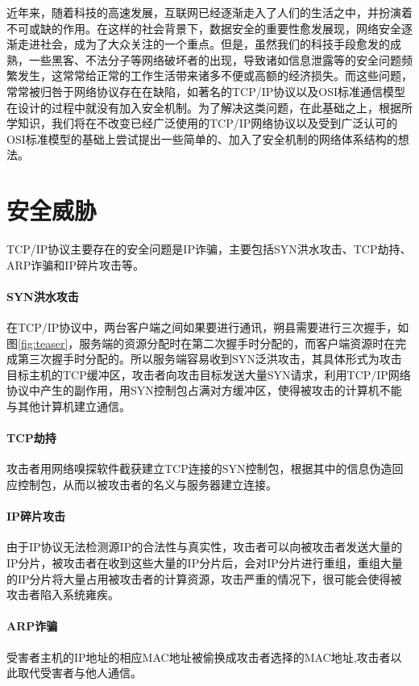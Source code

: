 \documentclass[final]{cvpr}
\begin{document}
近年来，随着科技的高速发展，互联网已经逐渐走入了人们的生活之中，并扮演着不可或缺的作用。在这样的社会背景下，数据安全的重要性愈发展现，网络安全逐渐走进社会，成为了大众关注的一个重点。但是，虽然我们的科技手段愈发的成熟，一些黑客、不法分子等网络破坏者的出现，导致诸如信息泄露等的安全问题频繁发生，这常常给正常的工作生活带来诸多不便或高额的经济损失。而这些问题，常常被归咎于网络协议存在在缺陷，如著名的TCP/IP协议以及OSI标准通信模型在设计的过程中就没有加入安全机制。为了解决这类问题，在此基础之上，根据所学知识，我们将在不改变已经广泛使用的TCP/IP网络协议以及受到广泛认可的OSI标准模型的基础上尝试提出一些简单的、加入了安全机制的网络体系结构的想法。



\section{安全威胁}
TCP/IP协议主要存在的安全问题是IP诈骗，主要包括SYN洪水攻击、TCP劫持、ARP诈骗和IP碎片攻击等。

\paragraph*{SYN洪水攻击} 在TCP/IP协议中，两台客户端之间如果要进行通讯，朔县需要进行三次握手，如图\ref*{fig:teaser}，服务端的资源分配时在第二次握手时分配的，而客户端资源时在完成第三次握手时分配的。所以服务端容易收到SYN泛洪攻击，其具体形式为攻击目标主机的TCP缓冲区，攻击者向攻击目标发送大量SYN请求，利用TCP/IP网络协议中产生的副作用，用SYN控制包占满对方缓冲区，使得被攻击的计算机不能与其他计算机建立通信。
\paragraph*{TCP劫持} 攻击者用网络嗅探软件截获建立TCP连接的SYN控制包，根据其中的信息伪造回应控制包，从而以被攻击者的名义与服务器建立连接。
\paragraph*{IP碎片攻击} 由于IP协议无法检测源IP的合法性与真实性，攻击者可以向被攻击者发送大量的IP分片，被攻击者在收到这些大量的IP分片后，会对IP分片进行重组，重组大量的IP分片将大量占用被攻击者的计算资源，攻击严重的情况下，很可能会使得被攻击者陷入系统雍疾。
\paragraph*{ARP诈骗} 受害者主机的IP地址的相应MAC地址被偷换成攻击者选择的MAC地址,攻击者以此取代受害者与他人通信。
\\ 
\end{document}
